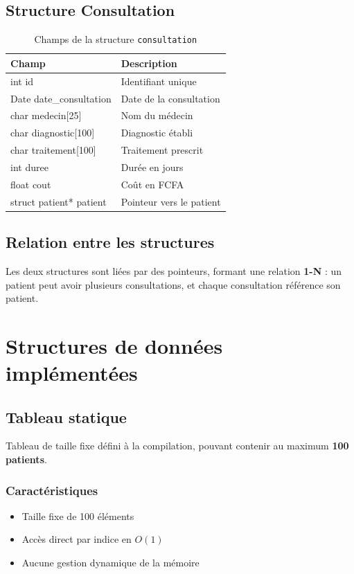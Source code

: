 \documentclass[12pt, a4paper]{article}
\begin{document}
\subsection{Structure Consultation}

\begin{table}[h]
\centering
{}
\begin{tabular}{>{\ttfamily}l l}
\toprule
\textbf{Champ} & \textbf{Description} \\
\midrule
int id & Identifiant unique \\
Date date\_consultation & Date de la consultation \\
char medecin[25] & Nom du médecin \\
char diagnostic[100] & Diagnostic établi \\
char traitement[100] & Traitement prescrit \\
int duree & Durée en jours \\
float cout & Coût en FCFA \\
struct patient* patient & Pointeur vers le patient \\
\bottomrule
\end{tabular}
\caption{Champs de la structure \texttt{consultation}}
\end{table}

\subsection{Relation entre les structures}
Les deux structures sont liées par des pointeurs, formant une 
relation \textbf{1-N} : un patient peut avoir plusieurs consultations, 
et chaque consultation référence son patient.

\section{Structures de données implémentées}

\subsection{Tableau statique}
Tableau de taille fixe défini à la compilation, pouvant contenir 
au maximum \textbf{100 patients}.

\subsubsection{Caractéristiques}
\begin{itemize}[leftmargin=2em, itemsep=3pt]
    \item Taille fixe de 100 éléments
    \item Accès direct par indice en $O(1)$
    \item Aucune gestion dynamique de la mémoire
\end{itemize}
\end{document}
